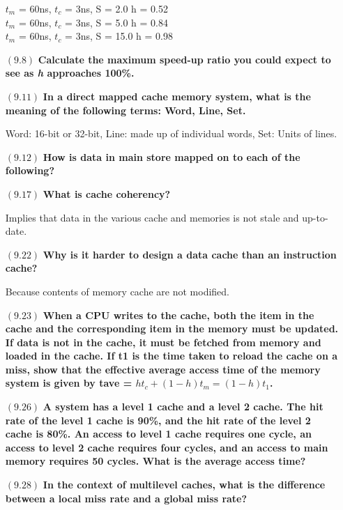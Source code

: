 \documentclass[letterpaper,10pt,titlepage]{article}
\begin{document}
\begin{enumerate}
$t_m$ = 60ns, $t_c$ = 3ns, S = 2.0
h = 0.52\\

$t_m$ = 60ns, $t_c$ = 3ns, S = 5.0
h = 0.84\\

$t_m$ = 60ns, $t_c$ = 3ns, S = 15.0
h = 0.98

\item[$(9.8)$] \textbf{Calculate the maximum speed-up ratio you could expect to see as \textit{h} approaches 100\%.}

\item[$(9.11)$] \textbf{In a direct mapped cache memory system, what is the meaning of the following terms: Word, Line, Set.}

Word: 16-bit or 32-bit, Line: made up of individual words, Set: Units of lines.

\item[$(9.12)$] \textbf{How is data in main store mapped on to each of the following?}

\item[$(9.17)$] \textbf{What is cache coherency?}

Implies that data in the various cache and memories is not stale and up-to-date.
	
\item[$(9.22)$] \textbf{Why is it harder to design a data cache than an instruction cache?}

Because contents of memory cache are not modified.

\item[$(9.23)$] \textbf{When a CPU writes to the cache, both the item in the cache and the corresponding item in the memory must be updated. If data is not in the cache, it must be fetched from memory and loaded in the cache. If t1 is the time taken to reload the cache on a miss, show that the effective average access time of the memory system is given by tave = $ht_c + (1 - h)t_m = (1 - h)t_1$.}

\item[$(9.26)$] \textbf{A system has a level 1 cache and a level 2 cache. The hit rate of the level 1 cache is 90\%, and the hit rate of the level 2 cache is 80\%. An access to level 1 cache requires one cycle, an access to level 2 cache requires four cycles, and an access to main memory requires 50 cycles. What is the average access time?}

\item[$(9.28)$] \textbf{In the context of multilevel caches, what is the difference between a local miss rate and a global miss rate?}


\end{enumerate}
\end{document}
